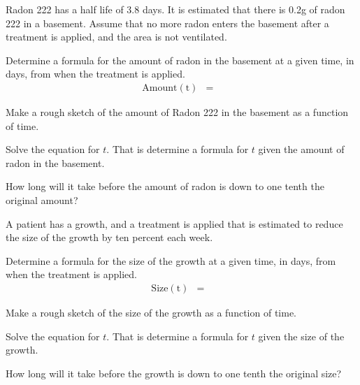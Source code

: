 \begin{problem}
\item Radon 222 has a half life of 3.8 days. It is estimated that
  there is 0.2g of radon 222 in a basement. Assume that no more
  radon enters the basement after a treatment is applied, and the area
  is not ventilated.
  \begin{subproblem}
    \item Determine a formula for the amount of radon in the basement
      at a given time, in days, from when the treatment is applied.
      \begin{eqnarray*}
        \mathrm{Amount(t)} & = & 
      \end{eqnarray*}
    \item Make a rough sketch of the amount of Radon 222 in the
      basement as a function of time.  
      \vfill
    \item Solve the equation for $t$. That is determine a formula for
      $t$ given the amount of radon in the basement.
      \vfill
    \item How long will it take before the amount of radon is down to
      one tenth the original amount?
      \vfill
  \end{subproblem}

\clearpage

\item A patient has a growth, and a treatment is applied that is
  estimated to reduce the size of the growth by ten percent each
  week. 
  \begin{subproblem}
  \item Determine a formula for the size of the growth at a given
    time, in days, from when the treatment is applied.
      \begin{eqnarray*}
        \mathrm{Size(t)} & = & 
      \end{eqnarray*}
    \item Make a rough sketch of the size of the growth as a function of time.  
      \vfill
    \item Solve the equation for $t$. That is determine a formula for
      $t$ given the size of the growth.
      \vfill
    \item How long will it take before the growth is down to
      one tenth the original size?
      \vfill
  \end{subproblem}


\end{problem}


\postClass

